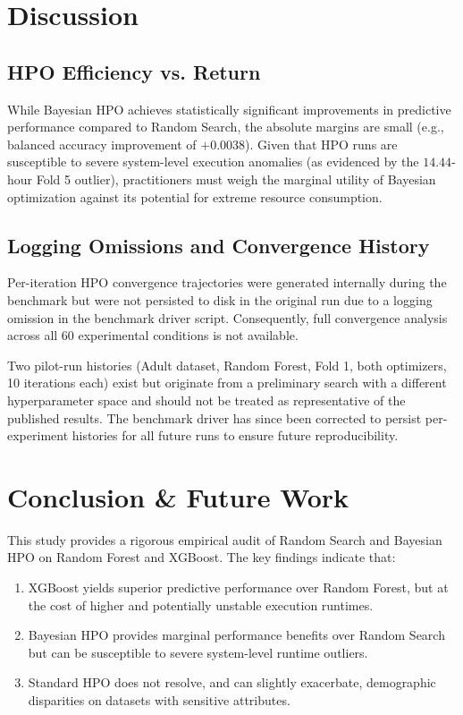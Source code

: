 \documentclass[11pt,a4paper]{article}
\begin{document}
\section{Discussion}

\subsection{HPO Efficiency vs. Return}
While Bayesian HPO achieves statistically significant improvements in predictive performance compared to Random Search, the absolute margins are small (e.g., balanced accuracy improvement of $+0.0038$). Given that HPO runs are susceptible to severe system-level execution anomalies (as evidenced by the $14.44$-hour Fold 5 outlier), practitioners must weigh the marginal utility of Bayesian optimization against its potential for extreme resource consumption.

\subsection{Logging Omissions and Convergence History}
Per-iteration HPO convergence trajectories were generated internally during the benchmark but were not persisted to disk in the original run due to a logging omission in the benchmark driver script. Consequently, full convergence analysis across all 60 experimental conditions is not available. 

Two pilot-run histories (Adult dataset, Random Forest, Fold 1, both optimizers, 10 iterations each) exist but originate from a preliminary search with a different hyperparameter space and should not be treated as representative of the published results. The benchmark driver has since been corrected to persist per-experiment histories for all future runs to ensure future reproducibility.

\section{Conclusion \& Future Work}
This study provides a rigorous empirical audit of Random Search and Bayesian HPO on Random Forest and XGBoost. The key findings indicate that:
\begin{enumerate}
    \item XGBoost yields superior predictive performance over Random Forest, but at the cost of higher and potentially unstable execution runtimes.
    \item Bayesian HPO provides marginal performance benefits over Random Search but can be susceptible to severe system-level runtime outliers.
    \item Standard HPO does not resolve, and can slightly exacerbate, demographic disparities on datasets with sensitive attributes.
\end{enumerate}
\end{document}
